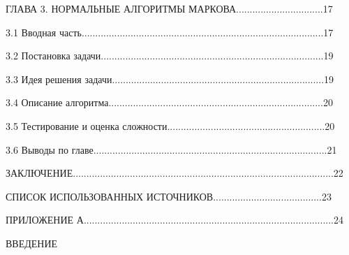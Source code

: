 \documentclass{article}
\begin{document}
\vspace{-0.2cm}
\noindent
ГЛАВА 3. НОРМАЛЬНЫЕ АЛГОРИТМЫ МАРКОВА................................17\\
\vspace{-0.2cm}
\par 3.1 Вводная часть.........................................................................................17\\
\vspace{-0.2cm}
\par 3.2 Постановка задачи..................................................................................19\\
\vspace{-0.2cm}
\par 3.3 Идея решения задачи..............................................................................19\\
\vspace{-0.2cm}
\par 3.4 Описание алгоритма...............................................................................20\\
\vspace{-0.2cm}
\par 3.5 Тестирование и оценка сложности..........................................................20\\
\vspace{-0.2cm}
\par 3.6 Выводы по главе......................................................................................21\\
\vspace{-0.2cm}

\noindent ЗАКЛЮЧЕНИЕ................................................................................................22\\
\vspace{-0.2cm}

\noindent 
СПИСОК ИСПОЛЬЗОВАННЫХ ИСТОЧНИКОВ........................................23\\
\vspace{-0.2cm}

\noindent
ПРИЛОЖЕНИЕ А............................................................................................24\\
\vspace{-0.2cm}

\vspace{1cm}

\begin{center}
    ВВЕДЕНИЕ
    \vspace{0.5cm}
    \pagestyle{plain} %
\end{center}
\end{document}
